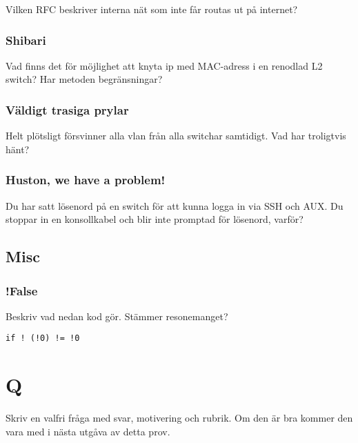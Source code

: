 Vilken RFC beskriver interna nät som inte får routas ut på internet?

\subsubsection{Shibari}\label{shibari}

Vad finns det för möjlighet att knyta ip med MAC-adress i en renodlad L2
switch? Har metoden begränsningar?

\subsubsection{Väldigt trasiga prylar}\label{vuxe4ldigt-trasiga-prylar}

Helt plötsligt försvinner alla vlan från alla switchar samtidigt. Vad
har troligtvis hänt?

\subsubsection{Huston, we have a
problem!}\label{huston-we-have-a-problem}

Du har satt lösenord på en switch för att kunna logga in via SSH och
AUX. Du stoppar in en konsollkabel och blir inte promptad för lösenord,
varför?

\subsection{Misc}\label{misc}

\subsubsection{!False}\label{false}

Beskriv vad nedan kod gör. Stämmer resonemanget?

\begin{verbatim}
if ! (!0) != !0
\end{verbatim}

\section{Q}\label{q}

Skriv en valfri fråga med svar, motivering och rubrik. Om den är bra
kommer den vara med i nästa utgåva av detta prov.
